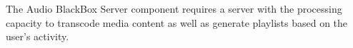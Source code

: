 The Audio BlackBox Server component requires a server with the processing capacity to transcode media content as well as generate playlists based on the user's activity.